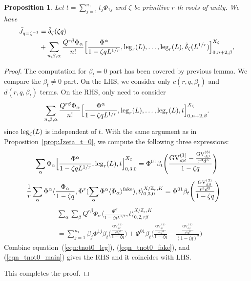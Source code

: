 \documentclass[11pt]{amsart}
\newtheorem{proposition}[theorem]{Proposition}
\newtheorem*{main theorem*}{Main Theorem}
\theoremstyle{remark}
\numberwithin{equation}{section}
\newcommand{\fake}{{\rm fake}}
\newcommand{\leg}{{\rm leg}}
\newcommand{\GV}{{\mathrm{GV}}}
\begin{document}
\begin{proposition} \label{prop_Jzeta_tnot0} Let $t= \sum_{j=1}^{n_1} t_j \Phi_{1j}$ and $\zeta$ be primitive $r$-th roots of unity. We have
\[
\begin{split}
    \tilde{J}_{q=\zeta^{-1}} &= \tilde{\delta}_{\zeta}(\zeta q)
    \\
    &+ \sum_{n,\beta,\alpha} \frac{Q^{r\beta} \Phi_{\alpha}}{n!} \Big[ \frac{\Phi^{\alpha}}{1-\zeta q L^{1/r}}, \leg_{r}(L) ,\dots, \leg_{r}(L), \tilde{\delta}_{\zeta}(L^{1/r}) \Big]^{X_{\zeta}}_{0,n+2,\beta},
\end{split}
\]
\end{proposition}
\begin{proof}
The computation for $\beta_t=0$ part has been covered by previous lemma. We compare the $\beta_t\neq 0$ part. On the LHS, we consider only $c(r,q,\beta_t)$ and $d(r,q,\beta_t)$ terms. On the RHS, only need to consider 
\[
\begin{split}
    \sum_{n,\beta,\alpha} \frac{Q^{r\beta} \Phi_{\alpha}}{n!} \Big[ \frac{\Phi^{\alpha}}{1-\zeta q L^{1/r}}, \leg_{r}(L) ,\dots, \leg_{r}(L), t \Big]^{X_{\zeta}}_{0,n+2,\beta}.
\end{split}
\]
since $\leg_{\zeta}(L)$ is independent of $t$.
With the same argument as in Proposition~\ref{prop:Jzeta_t=0}, we compute the following three expressions:
\begin{equation} \label{eqn:tnot0_leg}
\begin{split}
     \sum_{\alpha} \Phi_{\alpha} \Big[ \frac{\Phi^{\alpha}}{1-\zeta qL^{1/r}}, \leg_r(L), t \Big]^{X_{\zeta}}_{0,3,0}
    = \Phi^{01} \beta_t\Bigg( \frac{ \GV_{d\beta}^{(1)} - \frac{\GV_{d\beta}^{(3)}}{r^3d^3} }{1-\zeta q} \Bigg)
\end{split}
\end{equation}
\begin{equation} \label{eqn_tnot0_fake}
\begin{split}
    & \frac{1}{r} \sum_{\alpha} \Phi^{\alpha} \langle \frac{\Phi_{\alpha}}{1-\zeta q}, \Phi^r ( \sum_{\alpha} \Phi^{\alpha} \langle \Phi_{\alpha} \rangle^{\fake} ), t \rangle_{0,3,0}^{X/ \mathbb{Z}_r, K} = \Phi^{01} \beta_t \Bigg( \frac{ \frac{\GV_{d\beta}^{(3)}}{r^3d^3} }{1-\zeta q} \Bigg)
\end{split}
\end{equation}
\begin{equation} \label{eqn_tnot0_main}
\begin{split}
    &\sum_{\alpha} \sum_{\beta} Q^{r\beta} \Phi_{\alpha} \langle \frac{\Phi^{\alpha}}{1-\zeta q L^{1/r}}, t \rangle^{ X/ \mathbb{Z}_r, K }_{0,2,r\beta}
    \\
    & = \sum_{j=1}^{n_1} \beta_j\Phi^{1j} \beta_t \Bigg( \frac{ \frac{\GV_{d\beta}^{(3)}}{r^2d^2} }{1-\zeta q} \Bigg) + \Phi^{01} \beta_t\Bigg( 
    \frac{ \frac{\GV_{d\beta}^{(3)}}{r^3d^3} }{1-\zeta q} - \frac{ \frac{\GV_{d\beta}^{(3)}}{r^3d^3} }{(1-\zeta q)^2} \Bigg)
\end{split}
\end{equation}
Combine equation~(\ref{eqn:tnot0_leg}), (\ref{eqn_tnot0_fake}), and (\ref{eqn_tnot0_main}) gives the RHS and it coincides with LHS.

This completes the proof.
\end{proof}
\end{document}
